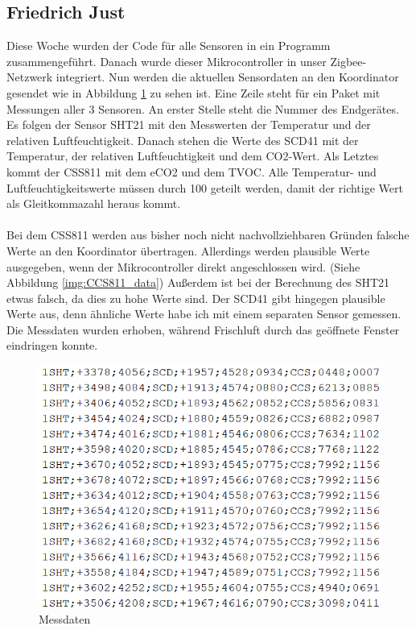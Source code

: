 \documentclass[]{article}
\begin{document}
\subsection{Friedrich Just}
Diese Woche wurden der Code für alle Sensoren  in ein Programm zusammengeführt. Danach wurde dieser Mikrocontroller in unser Zigbee-Netzwerk integriert. Nun werden die aktuellen Sensordaten an den Koordinator gesendet wie in Abbildung \ref{img:Messdaten} zu sehen ist. Eine Zeile steht für ein Paket mit Messungen aller 3 Sensoren.
An erster Stelle steht die Nummer des Endgerätes. Es folgen der Sensor SHT21 mit den Messwerten der Temperatur und der relativen Luftfeuchtigkeit. Danach stehen die Werte des SCD41 mit der Temperatur, der relativen Luftfeuchtigkeit und dem CO2-Wert. Als Letztes kommt der CSS811 mit dem eCO2 und dem TVOC. Alle Temperatur- und Luftfeuchtigkeitswerte müssen durch 100 geteilt werden, damit der richtige Wert als Gleitkommazahl heraus kommt.
\\\\
Bei dem CSS811 werden aus bisher noch nicht nachvollziehbaren Gründen falsche Werte an den Koordinator übertragen. Allerdings werden plausible Werte ausgegeben, wenn der Mikrocontroller direkt angeschlossen wird. (Siehe Abbildung \ref{img:CCS811_data}) Außerdem ist bei der Berechnung des SHT21 etwas falsch, da dies zu hohe Werte sind. Der SCD41 gibt hingegen plausible Werte aus, denn ähnliche Werte habe ich mit einem separaten Sensor gemessen. Die Messdaten wurden erhoben, während Frischluft durch das geöffnete Fenster eindringen konnte.
\begin{figure}[!h]
	\centering
	\includegraphics[scale=0.60]{images/Messdaten}
	\caption{Messdaten}
	\label{img:Messdaten}
\end{figure}
\end{document}
